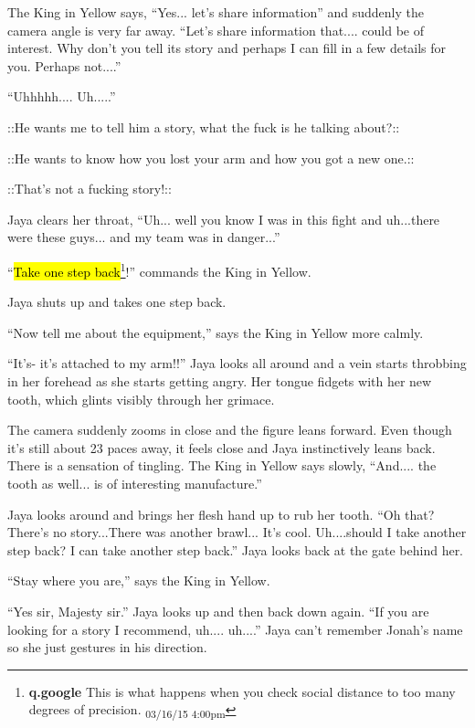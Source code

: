 The King in Yellow says, ``Yes... let's share information'' and suddenly the camera angle is very far away.  ``Let's share information that.... could be of interest.  Why don't you tell its story and perhaps I can fill in a few details for you.  Perhaps not....''

``Uhhhhh.... Uh.....''

 {\color[RGB]{255,0,0}::He wants me to tell him a story, what the fuck is he talking about?::} 

 {\color[RGB]{74,134,232}::He wants to know how you lost your arm and how you got a new one.::} 

 {\color[RGB]{255,0,0}::That's not a fucking story!::} 

Jaya clears her throat, ``Uh... well you know I was in this fight and uh...there were these guys... and my team was in danger...''

``\hl{Take one step back}\footnote{\textbf{q.google }This is what happens when you check social distance to too many degrees of precision. \textsubscript{03/16/15 4:00pm}}!'' commands the King in Yellow.

Jaya shuts up and takes one step back.

``Now tell me about the equipment,'' says the King in Yellow more calmly.

``It's- it's attached to my arm!!'' Jaya looks all around and a vein starts throbbing in her forehead as she starts getting angry. Her tongue fidgets with her new tooth, which glints visibly through her grimace.



The camera suddenly zooms in close and the figure leans forward. Even though it's still about 23 paces away, it feels close and Jaya instinctively leans back.  There is a sensation of tingling.  The King in Yellow says slowly, ``And.... the tooth as well... is of interesting manufacture.''

Jaya looks around and brings her flesh hand up to rub her tooth.  ``Oh that?  There's no story...There was another brawl... It's cool.  Uh....should I take another step back?  I can take another step back.''  Jaya looks back at the gate behind her.

``Stay where you are,'' says the King in Yellow.

``Yes sir, Majesty sir.''  Jaya looks up and then back down again. ``If you are looking for a story I recommend, uh.... uh....'' Jaya can't remember Jonah's name so she just gestures in his direction.

